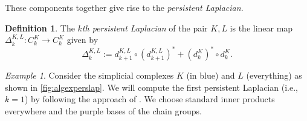 \documentclass[11pt]{article}
\theoremstyle{definition}
\newtheorem{definition}[theorem]{Definition}
\theoremstyle{remark}
\newtheorem{example}[theorem]{Example}
\begin{document}
These components together give rise to the \emph{persistent Laplacian}.
\begin{definition} \citep[Persistent Laplacian,][\S 2.2]{mww} \label{def:comb_PL}
    The \textit{$k$th persistent Laplacian} of the pair $K,L$ is the linear map $\Delta^{K,L}_k : C^{K}_k \to C^{K}_k$ given by 
    \[
    \Delta^{K,L}_k := d^{K,L}_{k+1} \circ (d^{K,L}_{k+1})^{*} +(d^{K}_k)^{*} \circ d^{K}_k.
    \]
\end{definition}

\begin{example} \label{ex:algperslap}  
    Consider the simplicial complexes $K$ (in blue) and $L$ (everything) as shown in \cref{fig:algexperslap}. We will compute the first persistent Laplacian (i.e., $k=1$) by following the approach of \citet{mww}. We choose standard inner products everywhere and the purple bases of the chain groups.
    

\end{example}
\end{document}
